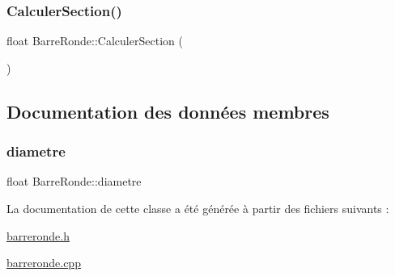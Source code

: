 \subsubsection{\texorpdfstring{Calculer\+Section()}{CalculerSection()}}
{\footnotesize\ttfamily float Barre\+Ronde\+::\+Calculer\+Section (\begin{DoxyParamCaption}{ }\end{DoxyParamCaption})}



\subsection{Documentation des données membres}
\mbox{\label{class_barre_ronde_ac1df0f24c2bbbb4fdb9533fa94639e92}} 
\subsubsection{\texorpdfstring{diametre}{diametre}}
{\footnotesize\ttfamily float Barre\+Ronde\+::diametre\hspace{0.3cm}{\ttfamily [private]}}



La documentation de cette classe a été générée à partir des fichiers suivants \+:\begin{DoxyCompactItemize}
\item 
\hyperlink{barreronde_8h}{barreronde.\+h}\item 
\hyperlink{barreronde_8cpp}{barreronde.\+cpp}\end{DoxyCompactItemize}
